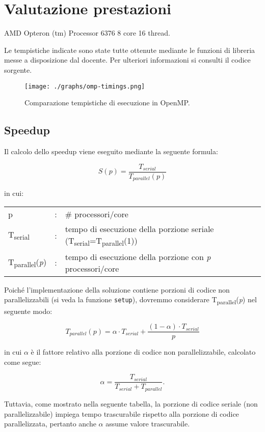 \section{Valutazione prestazioni}
AMD Opteron (tm) Processor 6376 8 core 16 thread.

Le tempistiche indicate sono state tutte ottenute mediante le funzioni di
libreria messe a disposizione dal docente. Per ulteriori informazioni si
consulti il codice sorgente.

\begin{figure}[h!]
  \centering
  \texttt{[image: ./graphs/omp-timings.png]}
  \caption{Comparazione tempistiche di esecuzione in OpenMP.}\label{fig:timings1}
\end{figure}

\subsection{Speedup}

Il calcolo dello speedup viene eseguito mediante la seguente formula:

\[ 
    S(p) = \frac{T_{serial}}{T_{parallel}(p)}
\]

in cui:
\begin{table}[ht]
\begin{tabular}{lll}
    p & : & \# processori/core\\
    T\textsubscript{serial}& : & tempo di esecuzione della porzione seriale
    (T\textsubscript{serial}=T\textsubscript{parallel}(1))\\
    T\textsubscript{parallel}(\textit{p}) & : & tempo di esecuzione della porzione con
    \textit{p} processori/core
\end{tabular}
\end{table}

Poiché l'implementazione della soluzione contiene porzioni di codice non
parallelizzabili (si veda la funzione \texttt{setup}), dovremmo considerare
T\textsubscript{parallel}(\textit{p}) nel seguente modo:

\[ 
T_{parallel}(p) = \alpha \cdot T_{serial} +  \frac{(1 - \alpha) \cdot
T_{serial}}{p}
\]

in cui $\alpha$ è il fattore relativo alla porzione di codice non
parallelizzabile, calcolato come segue:

\[ 
\alpha = \frac{T_{serial}}{T_{serial} + T_{parallel}}.
\]

Tuttavia, come mostrato nella seguente tabella, la porzione di codice seriale
(non parallelizzabile) impiega tempo trascurabile rispetto alla porzione di
codice parallelizzata, pertanto anche $\alpha$ assume valore trascurabile.

